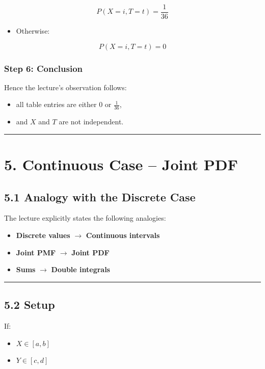 \documentclass[12pt]{article}
\begin{document}
\[
P(X=i,T=t)=\frac{1}{36}
\]

\begin{itemize}
    \item Otherwise:
\end{itemize}

\[
P(X=i,T=t)=0
\]

\subsubsection*{Step 6: Conclusion}

Hence the lecture’s observation follows:

\begin{itemize}
    \item all table entries are either \(0\) or \(\frac{1}{36}\),
    \item and \(X\) and \(T\) are not independent.
\end{itemize}

\hrule
\vspace{1em}

\section*{5. Continuous Case – Joint PDF}

\subsection*{5.1 Analogy with the Discrete Case}

The lecture explicitly states the following analogies:

\begin{itemize}
    \item \textbf{Discrete values} \(\rightarrow\) \textbf{Continuous intervals}
    \item \textbf{Joint PMF} \(\rightarrow\) \textbf{Joint PDF}
    \item \textbf{Sums} \(\rightarrow\) \textbf{Double integrals}
\end{itemize}

\hrule
\vspace{1em}

\subsection*{5.2 Setup}

If:

\begin{itemize}
    \item \(X \in [a,b]\)
    \item \(Y \in [c,d]\)
\end{itemize}
\end{document}
